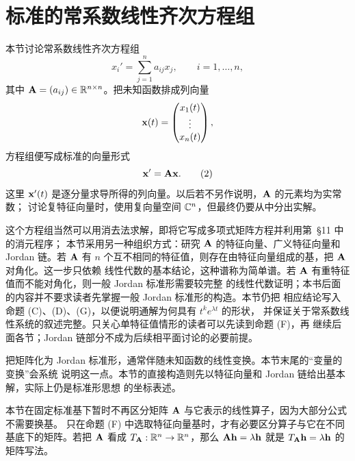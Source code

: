 \section{标准的常系数线性齐次方程组}

\newenvironment{sourceitem}[1]
  {\par\medskip\noindent\textbf{#1}\quad\ignorespaces}
  {\par\medskip}

本节讨论常系数线性齐次方程组
\begin{equation}
 x_i'=\sum_{j=1}^{n}a_{ij}x_j,\qquad i=1,\ldots,n,
 \tag{1}
\end{equation}
其中 \(\mathbf{A}=(a_{ij})\in\mathbb R^{n\times n}\)。把未知函数排成列向量
\[
 \vect{x}(t)=
 \begin{pmatrix}
  x_1(t)\\
  \vdots\\
  x_n(t)
 \end{pmatrix},
\]
方程组便写成标准的向量形式
\begin{equation}
 \vect{x}'=\mat{A}\vect{x}.
 \tag{2}
\end{equation}
这里 \(\vect{x}'(t)\) 是逐分量求导所得的列向量。以后若不另作说明，\(\mathbf{A}\) 的元素均为实常数；
讨论复特征向量时，使用复向量空间 \(\mathbb C^n\)，但最终仍要从中分出实解。

这个方程组当然可以用消去法求解，即将它写成多项式矩阵方程并利用第~\S11 中的消元程序；
本节采用另一种组织方式：研究 \(\mathbf{A}\) 的特征向量、广义特征向量和 Jordan 链。若 \(\mathbf{A}\) 有
\(n\) 个互不相同的特征值，则存在由特征向量组成的基，把 \(\mathbf{A}\) 对角化。这一步只依赖
线性代数的基本结论，这种谱称为简单谱。若 \(\mathbf{A}\) 有重特征值而不能对角化，则一般
Jordan 标准形需要较完整
的线性代数证明；本书后面的内容并不要求读者先掌握一般 Jordan 标准形的构造。本节仍把
相应结论写入命题 (C)、(D)、(G)，以便说明通解为何具有 \(t^k e^{\lambda t}\) 的形状，
并保证关于常系数线性系统的叙述完整。只关心单特征值情形的读者可以先读到命题 (F)，再
继续后面各节；Jordan 链部分不成为后续相平面讨论的必要前提。

把矩阵化为 Jordan 标准形，通常伴随未知函数的线性变换。本节末尾的“变量的变换”会系统
说明这一点。本节的直接构造则先以特征向量和 Jordan 链给出基本解，实际上仍是标准形思想
的坐标表述。

本节在固定标准基下暂时不再区分矩阵 \(\mathbf{A}\) 与它表示的线性算子，因为大部分公式不需要换基。
只在命题 (F) 中选取特征向量基时，才有必要区分算子与它在不同基底下的矩阵。若把 \(\mathbf{A}\)
看成 \(T_{\mathbf{A}}:\mathbb R^n\to\mathbb R^n\)，那么 \(\mat{A}\vect{h}=\lambda \vect{h}\) 就是 \(T_{\mat{A}}\vect{h}=\lambda \vect{h}\) 的矩阵写法。


